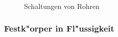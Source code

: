 \begin{figure}
   \centering
{}   
   \caption{Schaltungen von Rohren}
   \label{abb_rohre_schaltungen}
\end{figure}


\subsubsection{Festk"orper in Fl"ussigkeit}
\label{kap_festkorper-in-flussigkeit}

